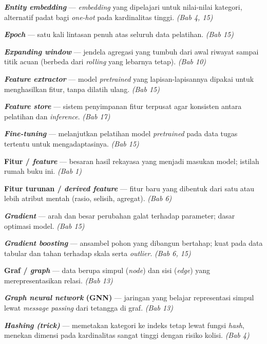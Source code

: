 \textbf{\emph{Entity embedding}} --- \emph{embedding} yang dipelajari untuk nilai-nilai kategori,
alternatif padat bagi \emph{one-hot} pada kardinalitas tinggi. \emph{(Bab 4, 15)}

\textbf{\emph{Epoch}} --- satu kali lintasan penuh atas seluruh data pelatihan. \emph{(Bab 15)}

\textbf{\emph{Expanding window}} --- jendela agregasi yang tumbuh dari awal riwayat sampai
titik acuan (berbeda dari \emph{rolling} yang lebarnya tetap). \emph{(Bab 10)}


\textbf{\emph{Feature extractor}} --- model \emph{pretrained} yang lapisan-lapisannya dipakai untuk
menghasilkan fitur, tanpa dilatih ulang. \emph{(Bab 15)}

\textbf{\emph{Feature store}} --- sistem penyimpanan fitur terpusat agar konsisten antara
pelatihan dan \emph{inference}. \emph{(Bab 17)}

\textbf{\emph{Fine-tuning}} --- melanjutkan pelatihan model \emph{pretrained} pada data tugas
tertentu untuk mengadaptasinya. \emph{(Bab 15)}

\textbf{Fitur / \emph{feature}} --- besaran hasil rekayasa yang menjadi masukan model;
istilah rumah buku ini. \emph{(Bab 1)}

\textbf{Fitur turunan / \emph{derived feature}} --- fitur baru yang dibentuk dari satu atau
lebih atribut mentah (rasio, selisih, agregat). \emph{(Bab 6)}


\textbf{\emph{Gradient}} --- arah dan besar perubahan galat terhadap parameter; dasar
optimasi model. \emph{(Bab 15)}

\textbf{\emph{Gradient boosting}} --- ansambel pohon yang dibangun bertahap; kuat pada data
tabular dan tahan terhadap skala serta \emph{outlier}. \emph{(Bab 6, 15)}

\textbf{Graf / \emph{graph}} --- data berupa simpul (\emph{node}) dan sisi (\emph{edge}) yang
merepresentasikan relasi. \emph{(Bab 13)}

\textbf{\emph{Graph neural network} (GNN)} --- jaringan yang belajar representasi simpul lewat
\emph{message passing} dari tetangga di graf. \emph{(Bab 13)}


\textbf{\emph{Hashing (trick)}} --- memetakan kategori ke indeks tetap lewat fungsi \emph{hash},
menekan dimensi pada kardinalitas sangat tinggi dengan risiko kolisi. \emph{(Bab 4)}


